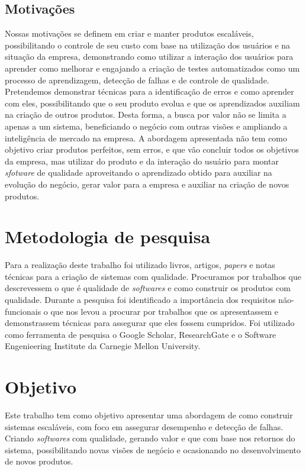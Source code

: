     \section{Motivações}
      Nossas motivações se definem em criar e manter produtos escaláveis,
      possibilitando o controle de seu custo com base na utilização
      dos usuários e na situação da empresa, demonstrando como utilizar a interação
      dos usuários para aprender como melhorar e engajando a criação de testes
      automatizados como um processo de aprendizagem, detecção de falhas e de
      controle de qualidade. \newline
      Pretendemos demonstrar técnicas para a identificação de erros e como
      aprender com eles, possibilitando que o seu produto evolua e que os
      aprendizados auxiliam na criação de outros produtos. Desta forma, a busca
      por valor não se limita a apenas a um sistema, beneficiando o negócio com
      outras visões e ampliando a inteligência de mercado na empresa. A abordagem
      apresentada não tem como objetivo criar produtos perfeitos, sem erros, e
      que vão concluir todos os objetivos da empresa, mas utilizar do produto e da
      interação do usuário para montar \textit{sfotware} de qualidade aproveitando
      o aprendizado obtido para auxiliar na evolução do negócio, gerar valor para
      a empresa e auxiliar na criação de novos produtos.

  \chapter{Metodologia de pesquisa}
    Para a realização deste trabalho foi utilizado livros, artigos, \textit{papers}
    e notas técnicas para a criação de sistemas com qualidade. Procuramos por trabalhos
    que descrevessem o que é qualidade de \textit{softwares} e como construir os
    produtos com qualidade. Durante a pesquisa foi identificado a importância dos
    requisitos não-funcionais o que nos levou a procurar por trabalhos que os
    apresentassem e demonstrassem técnicas para assegurar que eles fossem
    cumpridos. \newline
    Foi utilizado como ferramenta de pesquisa o Google Scholar, ResearchGate e o
    Software Engenieering Institute da Carnegie Mellon University.

  \chapter{Objetivo}
    Este trabalho tem como objetivo apresentar uma abordagem de como construir
    sistemas escaláveis, com foco em assegurar desempenho e detecção de falhas.
    Criando \textit{softwares} com qualidade, gerando valor e que com base nos
    retornos do sistema, possibilitando novas visões de negócio e ocasionando no
    desenvolvimento de novos produtos.
